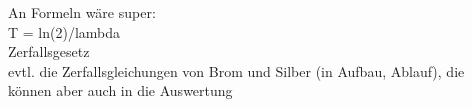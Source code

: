 An Formeln wäre super: \\
T = ln(2)/lambda \\
Zerfallsgesetz \\
evtl. die Zerfallsgleichungen von Brom und Silber (in Aufbau, Ablauf), die können aber auch in die Auswertung
